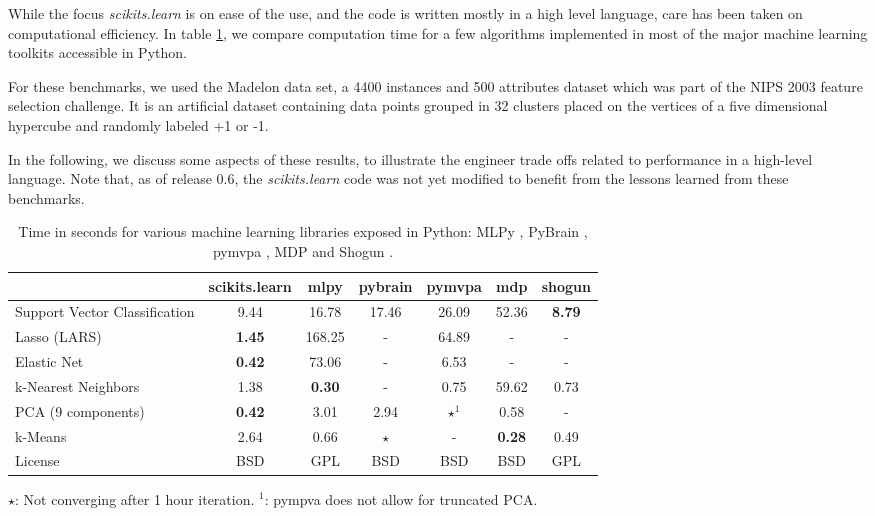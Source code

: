 \documentclass[twoside,11pt]{article}
\begin{document}

While the focus \emph{scikits.learn} is on ease of the use, and the
code is written mostly in a high level language, care has been taken
on computational efficiency. In table \ref{tab:comparisons}, we
compare computation time for a few algorithms implemented in most of
the major machine learning toolkits accessible in Python.  


For these benchmarks, we used the Madelon \citep{Guyon2004} data set,
a 4400 instances and 500 attributes dataset which was part of the NIPS
2003 feature selection challenge. It is an artificial dataset
containing data points grouped in 32 clusters placed on the vertices
of a five dimensional hypercube and randomly labeled +1 or -1.


In the following, we discuss some aspects of these results, to
illustrate the engineer trade offs related to performance in a
high-level language. Note that, as of release 0.6, the
\emph{scikits.learn} code was not yet modified to benefit from the
lessons learned from these benchmarks.

\begin{table}[tb]
\small
\hspace*{.03\linewidth}%
\begin{tabular}{l c c c c c c}
\hline\hline %
 & scikits.learn & mlpy & pybrain & pymvpa &  mdp & shogun \\ [0.5ex]
\hline
Support Vector Classification & 9.44 & 16.78 & 17.46 & 26.09 & 52.36 & {\bf 8.79} \\
Lasso (LARS) & {\bf 1.45} & 168.25   & -       &  64.89     & -    & - \\
Elastic Net & {\bf 0.42} & 73.06 & -  &  6.53  & -  & - \\
k-Nearest Neighbors & 1.38 & {\bf 0.30}  & - &  0.75 & 59.62    & 0.73 \\
PCA (9 components) & {\bf 0.42} & 3.01  & 2.94  & $\star^1$ & 0.58  & - \\
k-Means  & 2.64 & 0.66 & $\star$ & -  & {\bf 0.28} & 0.49 \\
License &  BSD & GPL & BSD  &  BSD  & BSD  & GPL \\
\hline
\end{tabular}

$\star$: Not converging after 1 hour iteration. \hfill $^1$: pympva does
not allow for truncated PCA.
\vspace*{-1ex}
\caption{\small
Time in seconds for various machine learning libraries exposed in Python:
MLPy \citep{albanese2008}, PyBrain \citep{schaul2010}, pymvpa
\citep{hanke2009}, MDP \citep{zito2008} and Shogun
\citep{sonnenburg2010}. \label{tab:comparisons}}
\end{table}
\end{document}
